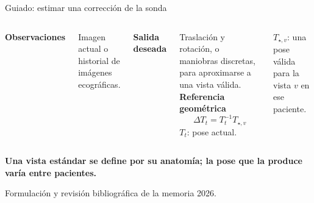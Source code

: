 \documentclass[aspectratio=169,11pt]{beamer}
\newcommand{\source}[1]{{\par\vspace{1mm}\fontsize{7}{8}\selectfont\color{muted}#1\par}}
\newcommand{\takeaway}[1]{{\par\vspace{2mm}\color{teal}\bfseries #1\par}}
\begin{document}
\begin{frame}{Guiado: estimar una corrección de la sonda}
\relax
\begin{columns}[T,onlytextwidth]
\textbf{Observaciones}
\par Imagen actual o historial de imágenes ecográficas.
\par\vspace{3mm}
\textbf{Salida deseada}
\par Traslación y rotación, o maniobras discretas, para aproximarse a una vista válida.
\textbf{Referencia geométrica}
\[\Delta T_t=T_t^{-1}T_{\star,v}\]
\small $T_t$: pose actual.\par
$T_{\star,v}$: una pose válida para la vista $v$ en ese paciente.
\end{columns}
\par\vspace{5mm}
\takeaway{Una vista estándar se define por su anatomía; la pose que la produce varía entre pacientes.}
\source{Formulación y revisión bibliográfica de la memoria 2026.}
\end{frame}
\end{document}
